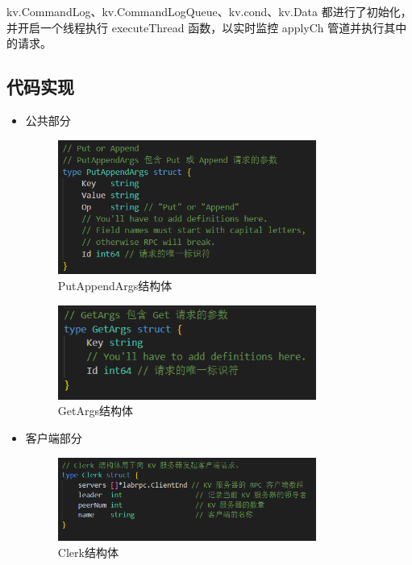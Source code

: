 \documentclass[]{article}
\begin{document}
	kv.CommandLog、kv.CommandLogQueue、kv.cond、kv.Data 都进行了初始化，并开启一个线程执行 executeThread 函数，以实时监控 applyCh 管道并执行其中的请求。
	
	\subsection{代码实现}
	\begin{itemize}
		\item 公共部分
		\begin{figure}[H]
			\centering
			\includegraphics[width=0.8\textwidth]{./3A/PutAppendArgs.png}
			\caption{PutAppendArgs结构体}
		\end{figure}
		\begin{figure}[H]
			\centering
			\includegraphics[width=0.8\textwidth]{./3A/GetArgs.png}
			\caption{GetArgs结构体}
		\end{figure}
		\item 客户端部分
		\begin{figure}[H]
			\centering
			\includegraphics[width=0.8\textwidth]{./3A/Clerk.png}
			\caption{Clerk结构体}
		\end{figure}
		\begin{figure}[H]

\end{figure}
\end{itemize}
\end{document}
